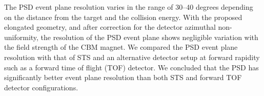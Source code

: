 The PSD event plane resolution varies in the range of 30--40 degrees depending on the distance from
the target and the collision energy. With the proposed elongated geometry, and after correction for the
detector azimuthal non-uniformity, the resolution of the PSD event plane shows negligible variation with
the field strength of the CBM magnet. We compared the PSD event plane resolution with that of STS
and an alternative detector setup at forward rapidity such as a forward time of flight (TOF) detector. We
concluded that the PSD has significantly better event plane resolution than both STS and forward TOF
detector configurations.
